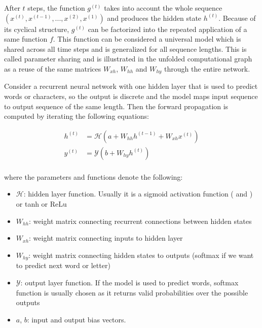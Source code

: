 \documentclass[]{krantz}
\providecommand{\tightlist}{%
  \setlength{\itemsep}{0pt}\setlength{\parskip}{0pt}}
\begin{document}
After \(t\) steps, the function \(g^{(t)}\) takes into account the whole sequence \((x^{(t)},x^{(t-1)},...,x^{(2)}, x^{(1)})\) and produces the hidden state \(h^{(t)}\). Because of its cyclical structure, \(g^{(t)}\) can be factorized into the repeated application of a same function \(f\). This function can be considered a universal model which is shared across all time steps and is generalized for all sequence lengths. This is called parameter sharing and is illustrated in the unfolded computational graph as a reuse of the same matrices \(W_{xh}\), \(W_{hh}\) and \(W_{hy}\) through the entire network. \citep{goodfellow2016deep}

Consider a recurrent neural network with one hidden layer that is used to predict words or characters, so the output is discrete and the model maps input sequence to output sequence of the same length. Then the forward propagation is computed by iterating the following equations:

\begin{align}
h^{(t)} & = \mathcal{H}(a+W_{hh}h^{(t-1)}+W_{xh}x^{(t)}) \label{eq:input-to-hidden} \\
y^{(t)} & = \mathcal{Y}(b+W_{hy}h^{(t)}) \label{eq:hidden-to-output} \\
\end{align}

where the parameters and functions denote the following:

\begin{itemize}
\tightlist
\item
  \(\mathcal{H}\): hidden layer function. Usually it is a sigmoid activation function ( \citet{sutskever2014sequence} and \citet{mikolov2010recurrent}) or tanh or ReLu
\item
  \(W_{hh}\): weight matrix connecting recurrent connections between hidden states
\item
  \(W_{xh}\): weight matrix connecting inputs to hidden layer
\item
  \(W_{hy}\): weight matrix connecting hidden states to outputs (softmax if we want to predict next word or letter)
\item
  \(\mathcal{Y}\): output layer function. If the model is used to predict words, softmax function is usually chosen as it returns valid probabilities over the possible outputs \citep{mikolov2010recurrent}
\item
  \(a\), \(b\): input and output bias vectors.
\end{itemize}
\end{document}
